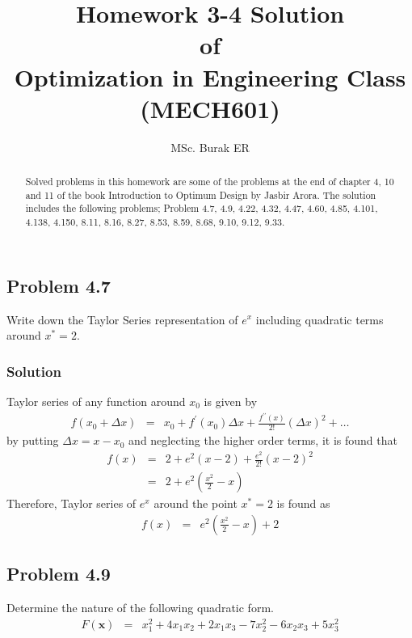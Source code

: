\documentclass[]{report}
\title{ Homework 3-4 Solution \\ \centering of \\ \centering Optimization in Engineering Class\\ \centering (MECH601)}
\author{MSc. Burak ER}
\begin{document}
\maketitle

\begin{abstract}
Solved problems in this homework are some of the problems at the end of chapter 4, 10 and 11 of the book Introduction to Optimum Design by Jasbir Arora\cite{arora2004introduction}. The solution includes the following problems; Problem 4.7, 4.9, 4.22, 4.32, 4.47, 4.60, 4.85, 4.101, 4.138, 4.150, 8.11, 8.16, 8.27, 8.53, 8.59, 8.68, 9.10, 9.12, 9.33.
\end{abstract}
\subsection*{Problem 4.7}
Write down the Taylor Series representation of $e^x$ including quadratic terms around $x^*=2$.
\subsubsection*{Solution}
Taylor series of any function around $x_0$ is given by
\begin{eqnarray}
f\left(x_0+\Delta x\right)&=&x_0+f^\prime\left(x_0\right)\Delta x+\frac{f^{\prime \prime}\left(x\right)}{2!}\left(\Delta x\right)^2+\dots
\end{eqnarray}
by putting $\Delta x=x-x_0$ and neglecting the higher order terms, it is found that
\begin{eqnarray*}
f\left(x\right)&=&2+e^2\left(x-2\right)+\frac{e^2}{2!}\left(x-2\right)^2 \\
&=&2+e^2\left(\frac{x^2}{2}-x\right)
\end{eqnarray*}
Therefore, Taylor series of $e^x$ around the point $x^*=2$ is found as
\begin{eqnarray*}
f\left(x\right)&=& e^2\left(\frac{x^2}{2}-x\right)+2
\end{eqnarray*}
\subsection*{Problem 4.9}
Determine the nature of the following quadratic form.
\begin{eqnarray}
F\left(\mathbf{x}\right)&=&x_1^2+4x_1x_2+2x_1x_3-7x_2^2-6x_2x_3+5x_3^2
\label{eqproblem:4.9}
\end{eqnarray}
\end{document}
